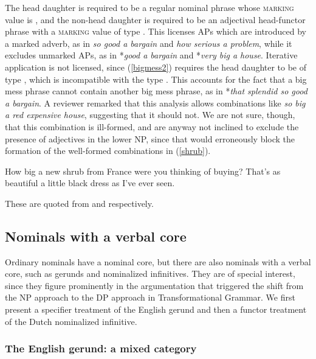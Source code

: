 \documentclass[output=paper
                ,modfonts
                ,nonflat
	        ,collection
	        ,collectionchapter
	        ,collectiontoclongg
 	        ,biblatex
                ,babelshorthands
                ,newtxmath
                ,draftmode
                ,colorlinks, citecolor=brown
]{./langsci/langscibook}
\begin{document}
\noindent
The head daughter is required to be a regular nominal phrase 
whose \textsc{marking} value is , and the non-head daughter 
is required to be an adjectival head-functor phrase
with a \textsc{marking} value of type . 
This licenses APs which are introduced by a marked adverb, 
as in \emph{so good a bargain} and \emph{how serious a problem}, 
while it excludes unmarked APs, as in 
*\emph{good a bargain} and *\emph{very big a house}.
Iterative application is not licensed, since (\ref{bigmess2}) requires the 
head daughter to be of type , which is incompatible with the type 
. This accounts for the fact that a big
mess phrase cannot contain another big mess phrase, as in
*\emph{that splendid so good a bargain}.
A reviewer remarked that this analysis allows combinations like 
\emph{so big a red expensive house}, suggesting that it should not. 
We are not sure, though, that this combination is ill-formed, 
and are anyway not inclined to exclude the presence of adjectives in 
the lower NP, since that would erroneously block the formation of the 
well-formed combinations in (\ref{shrub}).

\begin{exe} 
\ex\label{shrub} 
\begin{xlist} 
\ex  How big a new shrub from France were you thinking of buying? 
\ex  That's as beautiful a little black dress as I've ever seen.  
\end{xlist} 
\end{exe} 

\noindent
These are quoted from \citet[116]{Zwicky95} and \citet[42]{Troseth09} respectively. 


\subsection{Nominals with a verbal core} 


Ordinary nominals have a nominal core, but there are also nominals  
with a verbal core, such as gerunds and nominalized infinitives. They are 
of special interest, since they figure prominently in the argumentation 
that triggered the shift from the NP approach to the DP approach in Transformational 
Grammar. We first present a specifier treatment of the English gerund and then 
a functor treatment of the Dutch nominalized infinitive. 


\subsubsection{The English gerund: a mixed category} 
\end{document}
